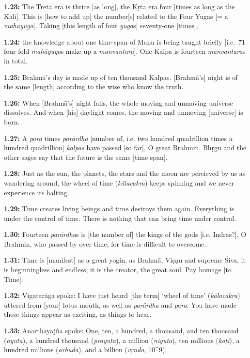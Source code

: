 \documentclass{article}
\newcommand{\vsnum}[1]{\textbf{#1}}
\newcommand{\skt}[1]{\textit{#1}}
\begin{document}
\vsnum{1.23: }The Tretā era is thrice [as long], the Kṛta era four [times as long as the Kali]. This is [how to add up] the number[s] related to the Four Yugas [= a \skt{mahāyuga}]. Taking [this length of four \skt{yuga}s] seventy-one [times],

\vsnum{1.24: }the knowledge about one time-span of Manu is being taught briefly [i.e.\ 71 four-fold \skt{mahāyuga}s make up a \skt{manvantara}]. One Kalpa is fourteen \skt{manvantara}s in total.

\vsnum{1.25: }Brahmā's day is made up of ten thousand Kalpas. [Brahmā's] night is of the same [length] according to the wise who know the truth.

\vsnum{1.26: }When [Brahmā's] night falls, the whole moving and unmoving universe dissolves. And when [his] daylight comes, the moving and unmoving [universe] is born.

\vsnum{1.27: }A \skt{para} times \skt{parārdha} [number of, i.e. two hundred quadrillion times a hundred quadrillion] \skt{kalpas} have passed [so far], O great Brahmin. Bhṛgu and the other sages say that the future is the same [time span].

\vsnum{1.28: }Just as the sun, the planets, the stars and the moon are percieved by us as wandering around, the wheel of time (\skt{kālacakra}) keeps spinning and we never experience its halting.

\vsnum{1.29: }Time creates living beings and time destroys them again. Everything is under the control of time. There is nothing that can bring time under control.

\vsnum{1.30: }Fourteen \skt{parārdha}s is [the number of] the kings of the gods [i.e. Indras?], O Brahmin, who passed by over time, for time is difficult to overcome.

\vsnum{1.31: }Time is [manifest] as a great yogin, as Brahmā, Viṣṇu and supreme Śiva, it is beginningless and endless, it is the creator, the great soul. Pay homage [to Time].

\vsnum{1.32: }Vigatarāga spoke: I have just heard [the term] `wheel of time' (\skt{kālacakra}) uttered from [your] lotus mouth, as well as \skt{parārdha} and \skt{para}. You have made these things appear as exciting, as things to hear.

\vsnum{1.33: }Anarthayajña spoke: One, ten, a hundred, a thousand, and ten thousand (\skt{ayuta}), a hundred thousand (\skt{prayuta}), a million (\skt{niyuta}), ten millions (\skt{koṭi}), a hundred millions (\skt{arbuda}), and a billion (\skt{vṛnda}, 10^9),
\end{document}
